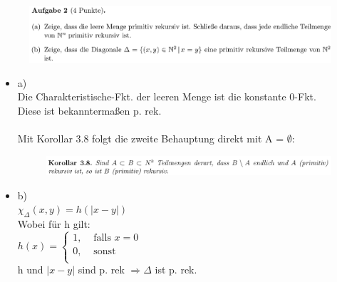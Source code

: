 \documentclass[a4paper]{scrartcl}%
\begin{document}

\newpage

\section*{}%
\label{sec:aufgabe_2}%

    \begin{figure}[H]
        \includegraphics[scale=0.3]{./A-2.png}
        \label{fig:}
    \end{figure}

    \begin{itemize}
        \item a)\\
            Die Charakteristische-Fkt. der leeren Menge ist die konstante 0-Fkt.\\
            Diese ist bekanntermaßen p. rek.\\
            \\Mit Korollar 3.8 folgt die zweite Behauptung direkt mit A = $\emptyset$:\\
            \begin{figure}[H]
                \centering
                \includegraphics[scale=0.3]{./Kor-3-8.png}
                \label{fig:./Kor-3-8}
            \end{figure}
        \item b)\\
            $\chi_{\Delta}(x,y) = h(|x - y|)$\\
            Wobei für h gilt:\\
            $h(x) =
            \begin{cases}
                1, &\text{ falls }x = 0\\
                0, &\text{ sonst }\\
            \end{cases}$\\
            h und $|x-y|$ sind p. rek $\Rightarrow \Delta$ ist p. rek.\\
    \end{itemize}
\end{document}
